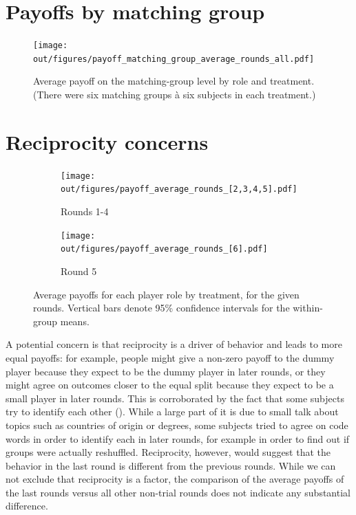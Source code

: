 \section{Payoffs by matching group}

\begin{figure}[!htb]
    \centering
    \texttt{[image: out/figures/payoff\_matching\_group\_average\_rounds\_all.pdf]}
    \caption{Average payoff on the matching-group level by role and treatment. (There were six matching groups à six subjects in each treatment.)}
    \label{fig:matching_group}
\end{figure}

\section{Reciprocity concerns}

\begin{figure}[!htb]
    \centering
    \begin{subfigure}[b]{0.49\textwidth}
        \centering
        \texttt{[image: out/figures/payoff\_average\_rounds\_[2,3,4,5].pdf]}
        \caption{Rounds 1-4}
    \end{subfigure}
    \hfill
    \begin{subfigure}[b]{0.49\textwidth}
        \centering
        \texttt{[image: out/figures/payoff\_average\_rounds\_[6].pdf]}
        \caption{Round 5}
    \end{subfigure}
    \caption{Average payoffs for each player role by treatment, for the given rounds. Vertical bars denote 95\% confidence intervals for the within-group means.}
    \label{fig:reciprocity}
\end{figure}

A potential concern is that reciprocity is a driver of behavior and leads to more equal payoffs: for example, people might give a non-zero payoff to the dummy player because they expect to be the dummy player in later rounds, or they might agree on outcomes closer to the equal split because they expect to be a small player in later rounds. This is corroborated by the fact that some subjects try to identify each other (). While a large part of it is due to small talk about topics such as countries of origin or degrees, some subjects tried to agree on code words in order to identify each in later rounds, for example in order to find out if groups were actually reshuffled. Reciprocity, however, would suggest that the behavior in the last round is different from the previous rounds. While we can not exclude that reciprocity is a factor, the comparison of the average payoffs of the last rounds versus all other non-trial rounds does not indicate any substantial difference.

